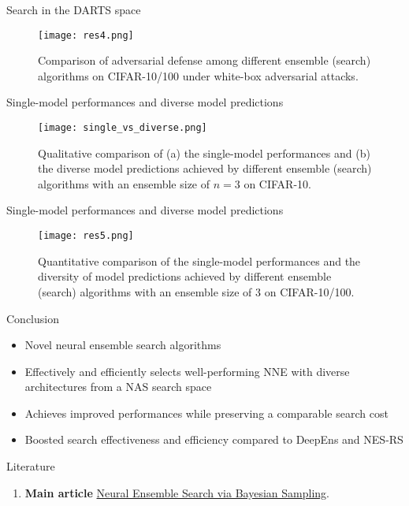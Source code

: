\documentclass{beamer}
\begin{document}
\begin{frame}{Search in the DARTS space}

\begin{figure}
    \centering
    \texttt{[image: res4.png]}
    \caption{Comparison of adversarial defense among different ensemble (search) algorithms on CIFAR-10/100 under white-box adversarial attacks.}
    \label{fig:res4}
\end{figure}

\end{frame}

\begin{frame}{Single-model performances and diverse model predictions}

\begin{figure}
    \centering
    \texttt{[image: single\_vs\_diverse.png]}
    \caption{Qualitative comparison of (a) the single-model performances and (b) the diverse model predictions achieved by different ensemble (search) algorithms with an ensemble size of $n = 3$ on CIFAR-10.}
    \label{fig:sin_vs_div}
\end{figure}

\end{frame}

\begin{frame}{Single-model performances and diverse model predictions}

\begin{figure}
    \centering
    \texttt{[image: res5.png]}
    \caption{Quantitative comparison of the single-model performances  and the diversity of model predictions achieved by different ensemble (search) algorithms with an ensemble size of 3 on CIFAR-10/100.}
    \label{fig:res5}
\end{figure}

\end{frame}


\begin{frame}{Conclusion}

\begin{itemize}
    \item Novel neural ensemble search algorithms
    \item Effectively and efficiently selects well-performing NNE with diverse architectures from a NAS search space
    \item Achieves improved performances while preserving a comparable search cost
    \item Boosted search effectiveness and efficiency compared to DeepEns and NES-RS
\end{itemize}
\end{frame}


\begin{frame}{Literature}
    \begin{enumerate}
        \item \textbf{Main article} \href{https://proceedings.mlr.press/v180/shu22a/shu22a.pdf}
        {Neural Ensemble Search via Bayesian Sampling}.
    \end{enumerate}
\end{frame}
\end{document}
